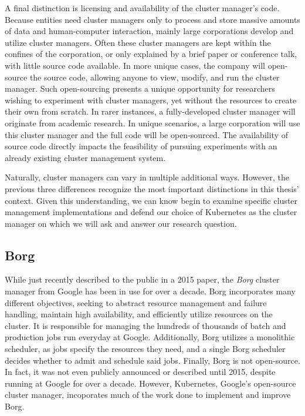\documentclass[twoside]{report}
\begin{document}
A final distinction is licensing and availability of the cluster manager's code.
Because entities need cluster managers only to process and store massive amounts
of data and human-computer interaction, mainly large
corporations develop and utilize cluster managers. Often these cluster
managers are kept within the confines of the corporation, or only explained by a
brief paper or conference talk, with little source code available. In more
unique cases, the company will open-source the source code, allowing anyone to
view, modify, and run the cluster manager. Such open-sourcing presents a unique opportunity
for researchers wishing to experiment with cluster managers, yet without the
resources to create their own from scratch. In rarer instances, a
fully-developed cluster manager will originate from academic research. In unique
scenarios, a large corporation will use this cluster manager and the full code will
be open-sourced. The availability of source code directly impacts the
feasibility of pursuing experiments with an already existing cluster management
system.

Naturally, cluster managers can vary in multiple additional ways. However,
the previous three differences recognize the most important distinctions in this
thesis' context. Given this understanding, we can know begin to examine specific
cluster management implementations and defend our choice of Kubernetes as the
cluster manager on which we will ask and answer our research question.

\subsection{Borg}

While just recently described to the public in a 2015 paper, the
\textit{Borg} cluster manager from Google has been in use for over a
decade.\cite[pg. 14]{borg} Borg incorporates
many different objectives, seeking to abstract resource management and failure
handling, maintain high availability, and efficiently utilize resources on the
cluster.\cite[pg. 1]{borg} It is responsible for managing the hundreds of
thousands of batch and production jobs run everyday at Google. Additionally,
Borg utilizes a monolithic scheduler, as jobs specify the
resources they need, and a single Borg scheduler decides whether to admit and
schedule said jobs. Finally, Borg is not open-source. In fact, it was not even
publicly announced or described until 2015, despite running at Google for over a
decade. However, Kubernetes, Google's open-source cluster manager, incoporates
much of the work done to implement and improve Borg.
\end{document}
